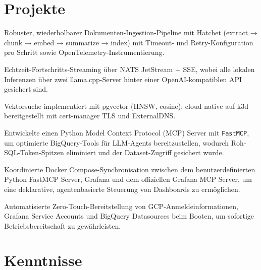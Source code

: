 \documentclass[10pt,a4paper]{resume}
\begin{document}
\vspace{2pt}

\section{Projekte}

\bullets
  \item Robuster, wiederholbarer Dokumenten-Ingestion-Pipeline mit Hatchet (extract → chunk → embed → summarize → index) mit Timeout- und Retry-Konfiguration pro Schritt sowie OpenTelemetry-Instrumentierung.
  \item Echtzeit-Fortschritts-Streaming über NATS JetStream + SSE, wobei alle lokalen Inferenzen über zwei llama.cpp-Server hinter einer OpenAI-kompatiblen API gesichert sind.
  \item Vektorsuche implementiert mit pgvector (HNSW, cosine); cloud-native auf k3d bereitgestellt mit cert-manager TLS und ExternalDNS.
\bulletsend
\vspace{1.0pt}
\bullets
  \item Entwickelte einen Python Model Context Protocol (MCP) Server mit \texttt{FastMCP}, um optimierte BigQuery-Tools für LLM-Agents bereitzustellen, wodurch Roh-SQL-Token-Spitzen eliminiert und der Dataset-Zugriff gesichert wurde.
  \item Koordinierte Docker Compose-Synchronisation zwischen dem benutzerdefinierten Python FastMCP Server, Grafana und dem offiziellen Grafana MCP Server, um eine deklarative, agentenbasierte Steuerung von Dashboards zu ermöglichen.
  \item Automatisierte Zero-Touch-Bereitstellung von GCP-Anmeldeinformationen, Grafana Service Accounts und BigQuery Datasources beim Booten, um sofortige Betriebsbereitschaft zu gewährleisten.
\bulletsend

\section{Kenntnisse}
\end{document}
